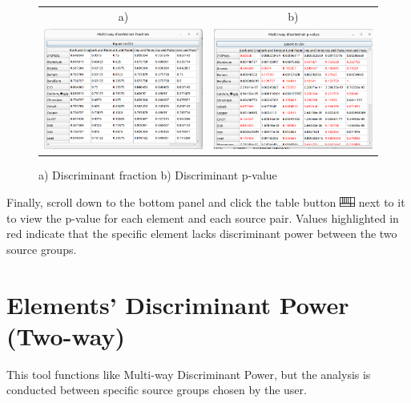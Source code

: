 \documentclass[12pt]{report}
\begin{document}
\begin{figure}[ht]
    \centering
    \begin{tabular}{c c}
        a) & b) \\
        \includegraphics[width=8cm]{Figures/Discriminant_Fraction.png} & \includegraphics[width=8cm]{Figures/Discriminant_p_value.png}
    \end{tabular}
    \caption{a) Discriminant fraction b) Discriminant p-value }
    \label{fig:DF-results}
\end{figure}
\FloatBarrier

Finally, scroll down to the bottom panel and click the table button \includegraphics[width=0.5cm]{Figures/table.png} next to it to view the p-value for each element and each source pair. Values highlighted in red indicate that the specific element lacks discriminant power between the two source groups.

\section{Elements' Discriminant Power (Two-way)}

This tool functions like Multi-way Discriminant Power, but the analysis is conducted between specific source groups chosen by the user. 
\end{document}

